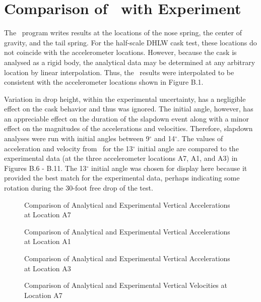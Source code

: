 \section{Comparison of \SLAP\ with Experiment}

The \SLAP\ program writes results at the locations of the nose spring,
the center of gravity, and the tail spring.  For the half-scale DHLW
cask test, these locations do not coincide with the accelerometer
locations. However, because the cask is analysed as a rigid body, the
analytical data may be determined at any arbitrary location by linear
interpolation.  Thus, the \SLAP\ results were interpolated to be
consistent with the accelerometer locations shown in Figure B.1.

     Variation in drop height, within the experimental uncertainty,
has a negligible effect on the cask behavior and thus was ignored.
The initial angle, however, has an appreciable effect on the duration
of the slapdown event along with a minor effect on the magnitudes of
the accelerations and velocities.  Therefore, slapdown analyses were
run with initial angles between 9$^\circ$ and 14$^\circ$.
The values of acceleration and velocity from \SLAP\
for the 13$^\circ$ initial angle are compared to the experimental data
(at the three accelerometer locations A7, A1, and A3) in Figures B.6
- B.11.  The 13$^\circ$ initial angle was chosen for display here
because it
provided the best match for the experimental data, perhaps indicating
some rotation during the 30-foot free drop
of the test.

\begin{figure}
\vspace{3.5 in}
\caption{Comparison of Analytical and Experimental Vertical
Accelerations at Location A7}
\end{figure}

\begin{figure}
\vspace{3.5 in}
\caption{Comparison of Analytical and Experimental Vertical
Accelerations at Location A1}
\end{figure}

\begin{figure}
\vspace{3.5 in}
\caption{Comparison of Analytical and Experimental Vertical
Accelerations at Location A3}
\end{figure}

\begin{figure}
\vspace{3.5 in}
\caption{Comparison of Analytical and Experimental Vertical
Velocities at Location A7}
\end{figure}

